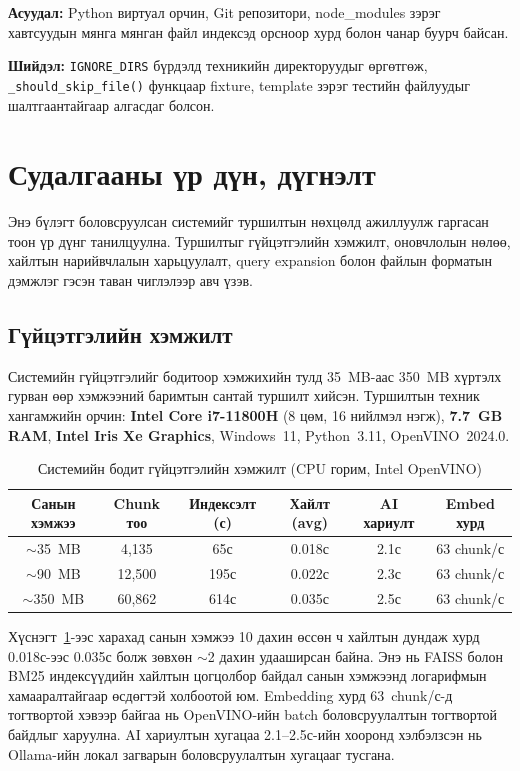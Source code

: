 \documentclass[11pt,a4paper]{article}
\newcommand{\fn}[1]{\nolinkurl{#1}}
\begin{document}
\textbf{Асуудал:} Python виртуал орчин, Git репозитори, node\_modules зэрэг хавтсуудын мянга мянган файл индексэд орсноор хурд болон чанар буурч байсан.

\textbf{Шийдэл:} \texttt{IGNORE\_DIRS} бүрдэлд техникийн директоруудыг өргөтгөж, \fn{_should_skip_file()} функцаар fixture, template зэрэг тестийн файлуудыг шалтгаантайгаар алгасдаг болсон.

\newpage
\section{Судалгааны үр дүн, дүгнэлт}

Энэ бүлэгт боловсруулсан системийг туршилтын нөхцөлд ажиллуулж гаргасан тоон үр дүнг танилцуулна. Туршилтыг гүйцэтгэлийн хэмжилт, оновчлолын нөлөө, хайлтын нарийвчлалын харьцуулалт, query expansion болон файлын форматын дэмжлэг гэсэн таван чиглэлээр авч үзэв.

\subsection{Гүйцэтгэлийн хэмжилт}

Системийн гүйцэтгэлийг бодитоор хэмжихийн тулд 35~MB-аас 350~MB хүртэлх гурван өөр хэмжээний баримтын сантай туршилт хийсэн. Туршилтын техник хангамжийн орчин: \textbf{Intel Core i7-11800H} (8 цөм, 16 нийлмэл нэгж), \textbf{7.7~GB RAM}, \textbf{Intel Iris Xe Graphics}, Windows~11, Python~3.11, OpenVINO~2024.0.

\begin{table}[H]
\centering
\caption{Системийн бодит гүйцэтгэлийн хэмжилт (CPU горим, Intel OpenVINO)}
\label{tab:benchmark}
\small
\begin{tabular}{|c|c|c|c|c|c|}
\hline
\textbf{Санын хэмжээ} & \textbf{Chunk тоо} & \textbf{Индексэлт (с)} & \textbf{Хайлт (avg)} & \textbf{AI хариулт} & \textbf{Embed хурд} \\
\hline
$\sim$35~MB  & 4,135  & 65с   & 0.018с & 2.1с & 63 chunk/с \\
\hline
$\sim$90~MB  & 12,500 & 195с  & 0.022с & 2.3с & 63 chunk/с \\
\hline
$\sim$350~MB & 60,862 & 614с  & 0.035с & 2.5с & 63 chunk/с \\
\hline
\end{tabular}
\end{table}

Хүснэгт~\ref{tab:benchmark}-ээс харахад санын хэмжээ 10 дахин өссөн ч хайлтын дундаж хурд 0.018с-ээс 0.035с болж зөвхөн $\sim$2 дахин удааширсан байна. Энэ нь FAISS болон BM25 индексүүдийн хайлтын цогцолбор байдал санын хэмжээнд логарифмын хамааралтайгаар өсдөгтэй холбоотой юм. Embedding хурд 63~chunk/с-д тогтвортой хэвээр байгаа нь OpenVINO-ийн batch боловсруулалтын тогтвортой байдлыг харуулна. AI хариултын хугацаа 2.1--2.5с-ийн хооронд хэлбэлзсэн нь Ollama-ийн локал загварын боловсруулалтын хугацааг тусгана.
\end{document}
